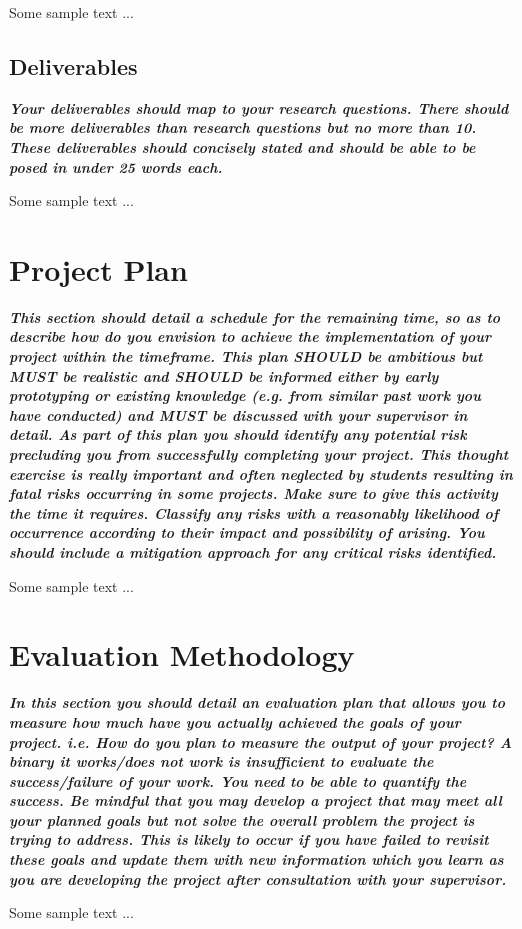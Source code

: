 \documentclass{article} %
\newcommand{\hint}[1] {\par {\bfseries \color{Blue} \it #1 \par}}
\begin{document}
Some sample text ...

\subsection{Deliverables}
\hint{Your deliverables should map to your research questions. There should be more deliverables than research questions but no more than 10. These deliverables should concisely stated and should be able to be posed in under 25 words each.}

Some sample text ...

\newpage
\section{Project Plan}
\hint{This section should detail a schedule for the remaining time, so as to describe how do you envision to achieve the implementation of your project within the timeframe. This plan SHOULD be ambitious but MUST be realistic and SHOULD be informed either by early prototyping or existing knowledge (e.g. from similar past work you have conducted) and MUST be discussed with your supervisor in detail.
As part of this plan you should identify any potential risk precluding you from successfully completing your project. This thought exercise is really important and often neglected by students resulting in fatal risks occurring in some projects. Make sure to give this activity the time it requires. Classify any risks with a reasonably likelihood of occurrence according to their impact and possibility of arising. You should include a mitigation approach for any critical risks identified.
}

Some sample text ...

\section{Evaluation Methodology}
\hint{In this section you should detail an evaluation plan that allows you to measure how much have you actually achieved the goals of your project. i.e. How do you plan to measure the output of your project? 
A binary it works/does not work is insufficient to evaluate the success/failure of your work. You need to be able to quantify the success. Be mindful that you may develop a project that may meet all your planned goals but not solve the overall problem the project is trying to address. This is likely to occur if you have failed to revisit these goals and update them with new information which you learn as you are developing the project after consultation with your supervisor.
}
Some sample text ...
\end{document}
